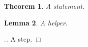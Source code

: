 \documentclass{article}
\newenvironment{PROOF}[2][\proofname.]
{\begin{proof}[#1]\renewcommand{\qedsymbol}{\textsquare$_{\rm #2}$}}
{\end{proof}}
\newtheorem{theorem}{Theorem}
\newtheorem{lemma}[theorem]{Lemma}
\begin{document}
\begin{theorem}\label{main}
A statement.
\end{theorem}
\begin{lemma}
A helper.
\end{lemma}
\begin{PROOF}{\ref{main}}
A step.
\end{PROOF}
\end{document}
